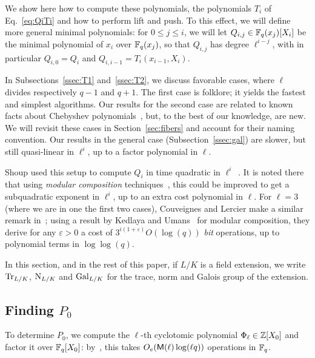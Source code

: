 \documentclass{sig-alternate}
\newcommand{\Cyc}{\Phi}  %
\begin{document}
We show here how to compute these polynomials, the polynomials $T_i$
of Eq.~\eqref{eq:QiTi} and how to perform lift and push.  To this
effect, we will define more general minimal polynomials: for $0 \le j
\le i$, we will let $Q_{i,j} \in \mathbb{F}_q(x_j)[X_i]$ be the minimal
polynomial of $x_i$ over $\mathbb{F}_q(x_j)$, so that $Q_{i,j}$ has degree
$\ell^{i-j}$, with in particular $Q_{i,0}=Q_i$ and
$Q_{i,i-1}=T_i(x_{i-1},X_i)$.

In Subsections~\ref{ssec:T1} and~\ref{ssec:T2}, we discuss favorable
cases, where $\ell$ divides respectively $q-1$ and $q+1$. The first
case is folklore; it yields the fastest and simplest algorithms. Our
results for the second case are related to known facts about Chebyshev
polynomials~\cite[\S~6.2]{silverman2007arithmetic}, but, to the best
of our knowledge, are new. We will revisit these cases in
Section~\ref{sec:fibers} and account for their naming convention. Our
results in the general case (Subsection~\ref{ssec:gal}) are slower,
but still quasi-linear in $\ell^i$, up to a factor polynomial in
$\ell$.


Shoup used this setup to compute $Q_i$ in time quad\-ratic in
$\ell^i$~\cite[Th.~11]{shoup94}. It is noted there that using {\em
  modular composition} techniques~\cite[Ch.~12]{vzGG}, this could be
improved to get a subquadratic exponent in $\ell^i$, up to an extra
cost polynomial in $\ell$.  For $\ell=3$ (where we are in one the
first two cases), Couveignes and Lercier make a similar remark
in~\cite[\S~2.4]{couveignes+lercier11}; using a result by Kedlaya and
Umans~\cite{KeUm11} for modular composition, they derive for any
$\varepsilon > 0$ a cost of $3^{i(1+\varepsilon)}O(\log(q))$ {\em bit}
operations, up to polynomial terms in $\log\log(q)$.

In this section, and in the rest of this paper, if $L/K$ is a field
extension, we write $\operatorname{Tr}_{L/K}$, $\operatorname{N}_{L/K}$ and $\operatorname{Gal}_{L/K}$ for
the trace, norm and Galois group of the extension. 


\subsection{Finding $P_0$}

To determine $P_0$, we compute the $\ell$-th cyclotomic polynomial
$\Cyc_\ell \in \Z[X_0]$ and factor it over $\mathbb{F}_q[X_0]$:
by~\cite[Th.~9]{shoup94}, this takes $O_e(\mathsf{M}(\ell)\log(\ell q))$
operations in $\mathbb{F}_q$.
\end{document}
